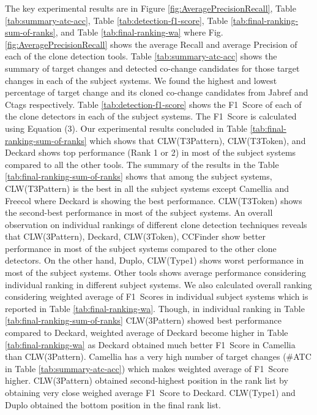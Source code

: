 \documentclass[review]{elsarticle}
\begin{document}
The key experimental results are in Figure \ref{fig:AveragePrecisionRecall}, Table \ref{tab:summary-atc-acc}, Table \ref{tab:detection-f1-score}, Table \ref{tab:final-ranking-sum-of-ranks}, and Table \ref{tab:final-ranking-wa} where Fig. \ref{fig:AveragePrecisionRecall} shows the average Recall and average Precision of each of the clone detection tools. Table \ref{tab:summary-atc-acc} shows the summary of target changes and detected co-change candidates for those target changes in each of the subject systems.  We found the highest and lowest percentage of target change and its cloned co-change candidates from Jabref and Ctags respectively. Table \ref{tab:detection-f1-score} shows the F1~Score of each of the clone detectors in each of the subject systems. The F1~Score is calculated using Equation (3). Our experimental results concluded in Table \ref{tab:final-ranking-sum-of-ranks} which shows that CLW(T3Pattern), CLW(T3Token), and Deckard shows top performance (Rank 1 or 2) in most of the subject systems compared to all the other tools. The summary of the results in the Table \ref{tab:final-ranking-sum-of-ranks} shows that among the subject systems, CLW(T3Pattern) is the best in all the subject systems except Camellia and Freecol where Deckard is showing the best performance. CLW(T3Token) shows the second-best performance in most of the subject systems. An overall observation on individual rankings of different clone detection techniques reveals that CLW(3Pattern), Deckard, CLW(3Token), CCFinder show better performance in most of the subject systems compared to the other clone detectors. On the other hand, Duplo, CLW(Type1) shows worst performance in most of the subject systems. Other tools shows average performance considering individual ranking in different subject systems. We also calculated overall ranking considering weighted average of F1~Scores in individual subject systems which is reported in Table \ref{tab:final-ranking-wa}. Though, in individual ranking in Table \ref{tab:final-ranking-sum-of-ranks} CLW(3Pattern) showed best performance compared to Deckard, weighted average of Deckard become higher in Table \ref{tab:final-ranking-wa} as Deckard obtained much better F1~Score in Camellia than CLW(3Pattern). Camellia has a very high number of target changes (\#ATC in Table \ref{tab:summary-atc-acc}) which makes weighted average of F1~Score higher. CLW(3Pattern) obtained second-highest position in the rank list by obtaining very close weighed average F1~Score to Deckard. CLW(Type1) and Duplo obtained the bottom position in the final rank list. 
\end{document}

